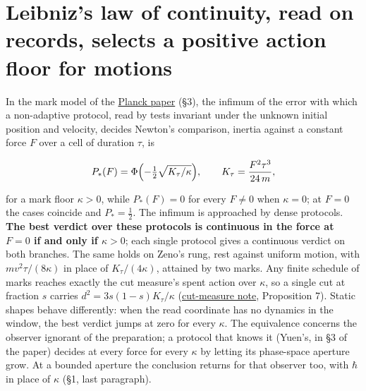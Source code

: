 \documentclass[11pt,a4paper]{article}
\begin{document}
\hypertarget{leibnizs-law-of-continuity-read-on-records-selects-a-positive-action-floor-for-motions}{%
\section{Leibniz's law of continuity, read on records, selects a
positive action floor for
motions}\label{leibnizs-law-of-continuity-read-on-records-selects-a-positive-action-floor-for-motions}}

In the mark model of the \href{planck-gap-paper.md}{Planck paper} (§3),
the infimum of the error with which a non-adaptive protocol, read by
tests invariant under the unknown initial position and velocity, decides
Newton's comparison, inertia against a constant force \(F\) over a cell
of duration \(\tau\), is

\[P_*(F)=\Phi\Bigl(-\tfrac12\sqrt{K_\tau/\kappa}\Bigr),\qquad K_\tau=\frac{F^2\tau^3}{24\,m},\]

for a mark floor \(\kappa>0\), while \(P_*(F)=0\) for every \(F\ne0\)
when \(\kappa=0\); at \(F=0\) the cases coincide and \(P_*=\frac12\).
The infimum is approached by dense protocols. \textbf{The best verdict
over these protocols is continuous in the force at \(F=0\) if and only
if \(\kappa>0\)}; each single protocol gives a continuous verdict on
both branches. The same holds on Zeno's rung, rest against uniform
motion, with \(mv^2\tau/(8\kappa)\) in place of \(K_\tau/(4\kappa)\),
attained by two marks. Any finite schedule of marks reaches exactly the
cut measure's spent action over \(\kappa\), so a single cut at fraction
\(s\) carries \(d^2=3s(1-s)K_\tau/\kappa\)
(\href{cut-measure-newton.md}{cut-measure note}, Proposition 7). Static
shapes behave differently: when the read coordinate has no dynamics in
the window, the best verdict jumps at zero for every \(\kappa\). The
equivalence concerns the observer ignorant of the preparation; a
protocol that knows it (Yuen's, in §3 of the paper) decides at every
force for every \(\kappa\) by letting its phase-space aperture grow. At
a bounded aperture the conclusion returns for that observer too, with
\(\hbar\) in place of \(\kappa\) (§1, last paragraph).
\end{document}
